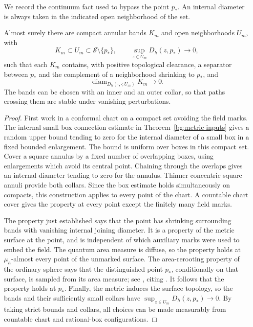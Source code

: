 We record the continuum fact used to bypass the point \(p_*\).
An internal diameter is always taken in the indicated open
neighborhood of the set.

\begin{lemma}
\label{finite:small-bands}
Almost surely there are compact annular bands \(K_m\) and open
neighborhoods \(U_m\), with
\[
 K_m\subset U_m\subset\mathcal S\setminus\{p_*\},
 \qquad
 \sup_{z\in U_m}D_h(z,p_*)\longrightarrow0,
\]
such that each \(K_m\) contains, with positive topological clearance,
a separator between \(p_*\) and the complement of a neighborhood
shrinking to \(p_*\), and
\[
             \operatorname{diam}_{D_h(\cdot,\cdot;U_m)}K_m
                          \longrightarrow0.
\]
The bands can be chosen with an inner and an outer collar, so that
paths crossing them are stable under vanishing perturbations.
\end{lemma}

\begin{proof}
First work in a conformal chart on a compact set avoiding the field
marks.  The internal small-box connection estimate in
Theorem~\ref{bg:metric-inputs} gives a
random upper bound tending to zero for the internal diameter of a
small box in a fixed bounded enlargement.  The bound is uniform
over boxes in this compact set.  Cover a square annulus by a fixed
number of overlapping boxes, using enlargements which avoid its
central point.  Chaining through the overlaps gives an internal
diameter tending to zero for the annulus.  Thinner concentric
square annuli provide both collars.  Since the box estimate holds
simultaneously on compacts, this construction applies to every
point of the chart.  A countable chart cover gives the property at
every point except the finitely many field marks.

The property just established says that the point has shrinking
surrounding bands with vanishing internal joining diameter.  It is
a property of the metric surface at the point, and is independent
of which auxiliary marks were used to embed the field.  The
quantum area measure is diffuse, so the property holds at
\(\mu_h\)-almost every point of the unmarked surface.
The area-rerooting property of the ordinary sphere says that the
distinguished point \(p_*\), conditionally on that surface, is
sampled from its area measure; see
\cite[Remark 1.3]{MillerSheffieldSphere}, citing
\cite[Proposition A.13]{DMS}.
It follows that the property holds at \(p_*\).
Finally, the metric induces the surface topology, so the bands
and their sufficiently small collars have
\(\sup_{z\in U_m}D_h(z,p_*)\to0\).
By taking strict bounds and collars, all choices can be made
measurably from countable chart and rational-box configurations.
\end{proof}

